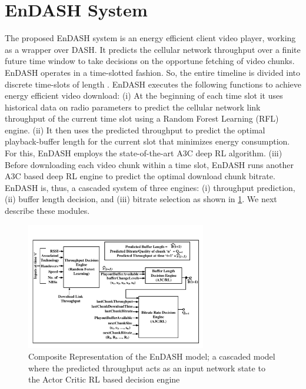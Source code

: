 \section{EnDASH System}\label{sec:chap04:sys_overview}
The proposed EnDASH system is an energy efficient client video player, working as a wrapper over \ac{DASH}. It predicts the cellular network throughput over a finite future time window to take decisions on the opportune fetching of  video chunks.  EnDASH operates in a time-slotted fashion. So, the entire timeline is divided into discrete time-slots of length .
EnDASH executes the following functions to achieve energy efficient video download: (i) At the beginning of each time slot it uses historical data on radio parameters to predict the cellular network link throughput of the current time slot using a Random Forest Learning (RFL) engine. (ii) It then uses the predicted throughput to predict the optimal playback-buffer length for the current slot that minimizes energy consumption. For this, EnDASH employs the state-of-the-art \ac{A3C} deep \ac{RL} algorithm.  (iii) Before downloading each video chunk within a time slot, EnDASH runs another A3C based deep \ac{RL} engine to predict the optimal download chunk  bitrate. 
EnDASH is, thus, a cascaded system of three engines: (i) throughput prediction, (ii) buffer length decision,  and (iii) bitrate selection as shown in \fig\ref{fig:chap04:EnDASH system}. We next describe these modules.
 \begin{figure}[t]
	\centering
	\includegraphics[width = 0.7\textwidth,trim = {1cm 1cm 1cm 1cm}]{figures/EnDASH_system.pdf}
	\caption{Composite Representation of the EnDASH model; a cascaded model where the predicted throughput acts as an input network state to the Actor Critic \ac{RL} based decision engine}
	\label{fig:chap04:EnDASH system}
\end{figure}

